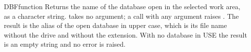 \begin{XbaseEntry}{DBF}{function}
Returns the name of the database open in the selected work area, as a character string.
\Syntax
{}
\Usage
{} takes no argument; a call with any argument raises . The result is the alias of the open database in upper case, which is its file name without the drive and without the extension. With no database in USE the result is an empty string and no error is raised.
\Examples
{}
\end{XbaseEntry}

